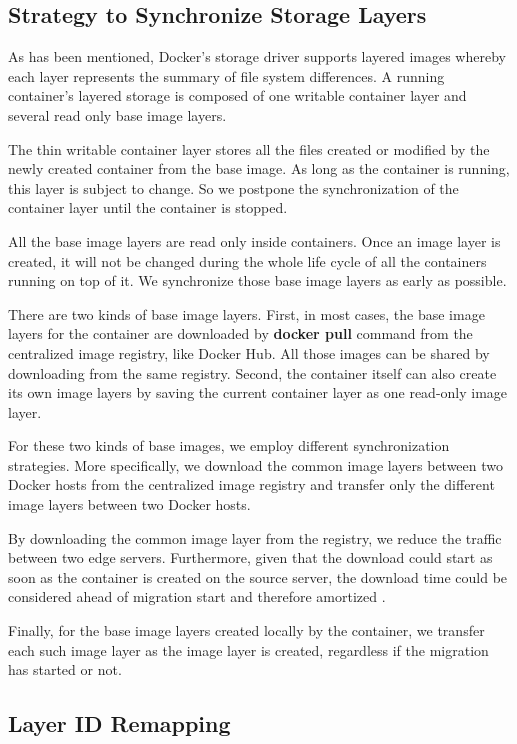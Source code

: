 \subsection{Strategy to Synchronize Storage Layers} \label{design:syncImage}

As has been mentioned, Docker's storage driver supports layered images whereby each layer represents the summary of file system differences. A running container's layered storage is composed of one writable container layer and several read only base image layers. 

The thin writable container layer stores all the files created or modified by the newly created container from the base image. As long as the container is running, this layer is subject to change. So we postpone the synchronization of the container layer until the container is stopped.

All the base image layers are read only inside containers. Once an image layer is created, it will not be changed during the whole life cycle of all the containers running on top of it. We synchronize those base image layers as early as possible.

There are two kinds of base image layers. First, in most cases, the base image layers for the container are downloaded by \textbf{docker pull} command from the centralized image registry, like Docker Hub. All those images can be shared by downloading from the same registry. Second, the container itself can also create its own image layers by saving the current container layer as one read-only image layer. 

For these two kinds of base images, we employ different synchronization strategies. More specifically, we download the common image layers between two Docker hosts from the centralized image registry and transfer only the different image layers between two Docker hosts.

By downloading the common image layer from the registry, we reduce the traffic between two edge servers. Furthermore, given that the download could start as soon as the container is created on the source server, the download time could be considered ahead of migration start and therefore amortized .

Finally, for the base image layers created locally by the container, we transfer each such image layer as the image layer is created, regardless if the migration has started or not. 

\subsection{Layer ID Remapping} \label{design:idremapping}

